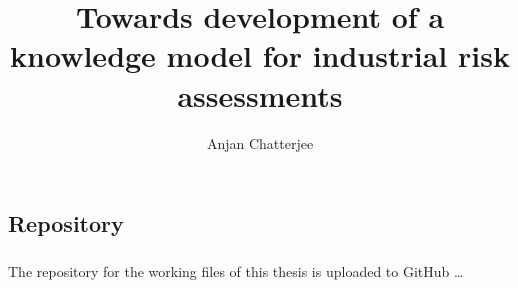 \documentclass[
		master, %
		theotuv, %
		nomencl, %
		hyperref,
		nolof,
		nolot,
		nolst,
		bibnum
	]{mrcc}
\author{Anjan Chatterjee}
\title{Towards development of a knowledge model for industrial risk assessments}
\begin{document}
        \listoffigures
	
	
	
	
	
	
	
	
        
	\begin{appendix}
		\chapter{Repository}
        \paragraph{} The repository for the working files of this thesis is uploaded to GitHub 
		\dots{}
	\end{appendix}
\end{document}
